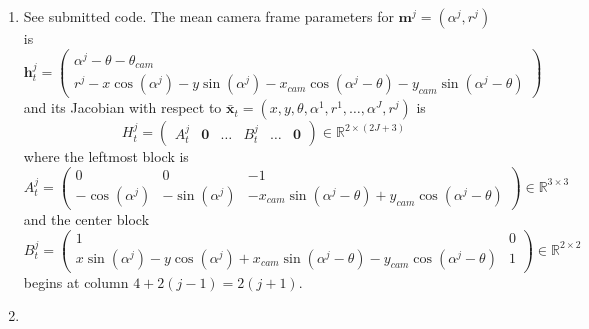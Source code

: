 \documentclass[12pt]{article}
\begin{document}
\begin{enumerate}
\begin{align*}
\begin{array}{cccccccc}
		0 & 0 & 1 & 0 & 0 & \ldots & 0 & 0 \\
		0 & 0 & 0 & 1 & 0 & \ldots & 0 & 0 \\
		0 & 0 & 0 & 0 & 1 & \ldots & 0 & 0 \\
		\vdots & \vdots & \vdots & \vdots & \vdots & \ddots & \vdots & \vdots \\
		0 & 0 & 0 & 0 & 0 & \ldots & 1 & 0 \\
		0 & 0 & 0 & 0 & 0 & \ldots & 0 & 1
		\end{array}\right) \\
		G_u = \frac{1}{\omega_t}&\left(\begin{array}{cc}
		\sin(\theta_t) - \sin(\theta_{t-1}) & -\frac{V_t}{\omega_t}(\sin(\theta_t) - \sin(\theta_{t-1})) + V_t\cos(\theta_t)dt \\
		-\cos(\theta_t) + \cos(\theta_{t-1}) & \frac{V_t}{\omega_t}(\cos(\theta_t) - \cos(\theta_{t-1})) + V_t\sin(\theta_t)dt \\
		0 & \omega_tdt \\
		0 & dt \\
		0 & 0 \\
		0 & 0 \\
		\vdots & \vdots \\
		0 & 0 \\
		0 & 0
		\end{array}\right).
	\end{align*}
	where $\theta_t := \theta_{t-1} + \omega_tdt$.
	\item See submitted code. The mean camera frame parameters for $\mathbf{m}^j = (\alpha^j, r^j)$ is
	\[
		\mathbf{h}_t^j = \left(\begin{array}{c}
		\alpha^j - \theta - \theta_{cam} \\
		r^j - x\cos(\alpha^j) - y\sin(\alpha^j) - x_{cam}\cos(\alpha^j - \theta) - y_{cam}\sin(\alpha^j - \theta)
		\end{array}\right)
	\]
	and its Jacobian with respect to $\bar{\mathbf{x}}_t = (x,y,\theta,\alpha^1,r^1,\ldots, \alpha^J,r^j)$ is
	\[
		H_t^j = \left(\begin{array}{cccccc}
		A_t^j & \mathbf{0} & \ldots & B_t^j & \ldots & \mathbf{0}
		\end{array}\right) \in \mathbb{R}^{2 \times (2J + 3)}
	\]
	where the leftmost block is
	\[
		A_t^j = \left(\begin{array}{ccc}
			0 & 0 & -1 \\
			-\cos(\alpha^j) & -\sin(\alpha^j) & -x_{cam}\sin(\alpha^j - \theta) + y_{cam}\cos(\alpha^j - \theta)
		\end{array}\right) \in \mathbb{R}^{3 \times 3}
	\]
	and the center block
	\[
		B_t^j = \left(\begin{array}{cc}
			1 & 0 \\
			x\sin(\alpha^j) - y\cos(\alpha^j) + x_{cam}\sin(\alpha^j - \theta) -y_{cam}\cos(\alpha^j - \theta) & 1
		\end{array}\right) \in \mathbb{R}^{2 \times 2}
	\]
	begins at column $4 + 2(j-1) = 2(j+1)$.
	\item 
\end{enumerate}
\end{document}
